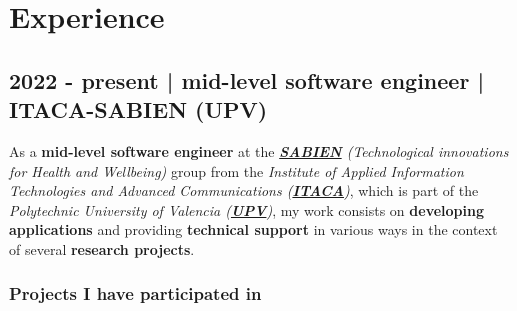 \documentclass[letterpaper, 12pt, dvipsnames]{article}
\newcommand{\uniFull}{Polytechnic University of Valencia}
\newcommand{\uniUrl}{https://www.upv.es/es}
\newcommand{\sabienUrl}{http://www.sabien.upv.es/}
\begin{document}
\begin{adjustwidth}{-1.5cm}{}
\end{adjustwidth}

\pagebreak

\section*{Experience}

\subsection*{2022 - present | mid-level software engineer | ITACA-SABIEN (UPV)}

As a \textbf{mid-level software engineer} at the \emph{\textbf{\href{\sabienUrl}{SABIEN}} (Technological innovations for Health and Wellbeing)} group from the \emph{Institute of Applied Information Technologies and Advanced Communications (\textbf{\href{http://www.itaca.upv.es/}{ITACA}})}, which is part of the \emph{{\uniFull} (\textbf{\href{\uniUrl}{UPV}})}, my work consists on \textbf{developing applications} and providing \textbf{technical support} in various ways in the context of several \textbf{research projects}.

\subsubsection*{Projects I have participated in}
\end{document}
